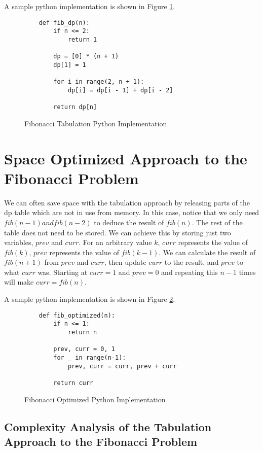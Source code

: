 A sample python implementation is shown in Figure \ref{fig:fibonacci-dp}.

\begin{figure}[H]
    \centering
    \begin{lstlisting}
    def fib_dp(n):
        if n <= 2:
            return 1
    
        dp = [0] * (n + 1)
        dp[1] = 1
    
        for i in range(2, n + 1):
            dp[i] = dp[i - 1] + dp[i - 2]
    
        return dp[n]
    \end{lstlisting}
    \caption{Fibonacci Tabulation Python Implementation}
    \label{fig:fibonacci-dp}
\end{figure}


\section*{Space Optimized Approach to the Fibonacci Problem}
We can often save space with the tabulation approach by releasing parts of the dp table which are not in use from memory.
In this case, notice that we only need $fib(n-1) and fib(n-2)$ to deduce the result of $fib(n)$.
The rest of the table does not need to be stored. 
We can achieve this by storing just two variables, $prev$ and $curr$.
For an arbitrary value $k$, $curr$ represents the value of $fib(k)$, $prev$ represents the value of $fib(k-1)$.
We can calculate the result of $fib(n+1)$ from $prev$ and $curr$, then update $curr$ to the result, and $prev$ to what $curr$ was.
Starting at $curr=1$ and $prev=0$ and repeating this $n-1$ times will make $curr = fib(n)$.

A sample python implementation is shown in Figure \ref{fig:fibonacci-optimized}.
\begin{figure}[H]
    \centering
    \begin{lstlisting}
    def fib_optimized(n):
        if n <= 1:
            return n
        
        prev, curr = 0, 1
        for _ in range(n-1):
            prev, curr = curr, prev + curr
            
        return curr
    \end{lstlisting}
    \caption{Fibonacci Optimized Python Implementation}
    \label{fig:fibonacci-optimized}
\end{figure}

\subsection{Complexity Analysis of the Tabulation Approach to the Fibonacci Problem}

